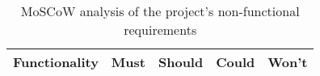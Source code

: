 \begin{table}[H]
	\centering
	\small
    \begin{tabular}{|p{9.3cm}|p{1.3cm}|p{1.3cm}|p{1.3cm}|p{1.3cm}|}
    \hline
    \textbf{Functionality} & \textbf{Must} & \textbf{Should} & \textbf{Could} & \textbf{Won't} \\ \hline

    \end{tabular}
    \caption {MoSCoW analysis of the project's non-functional requirements}
\end{table}